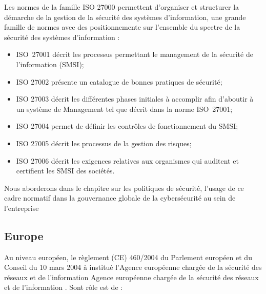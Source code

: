 Les normes de la famille ISO 27000 permettent d’organiser et structurer la démarche de la gestion de la sécurité des systèmes d’information, une grande famille de normes avec des  positionnemente sur l'ensemble du spectre  de la sécurité des systèmes d'information : 

\begin{itemize}
  \item ISO~27001 décrit les processus permettant le management de la sécurité de l’information (SMSI);
  \item ISO 27002 présente un catalogue de bonnes pratiques de sécurité;
  \item ISO 27003 décrit les différentes phases initiales à accomplir afin d’aboutir à un système de Management tel que décrit dans la norme ISO~27001;
  \item ISO 27004 permet de définir les contrôles de fonctionnement du SMSI;
  \item ISO 27005 décrit les processus de la gestion des risques;
  \item ISO 27006 décrit les exigences relatives aux organismes qui auditent et certifient les SMSI des sociétés.
\end{itemize}

Nous aborderons dans le chapitre sur les politiques de sécurité, l'usage de ce cadre normatif dans la gouvernance globale de la cybersécurité au sein de l'entreprise


\subsection{Europe}

Au niveau européen, le règlement (CE) 460/2004 du Parlement européen et du Conseil du 10 mars 2004 à institué l'Agence européenne chargée de la sécurité des réseaux et de l'information  Agence européenne chargée de la sécurité des réseaux et de l'information . Sont rôle est de : 


